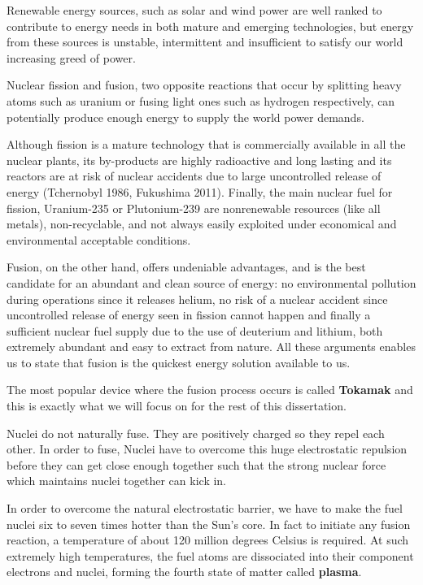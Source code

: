 \documentclass[12pt,lot, lof]{puthesis}
\begin{document}
Renewable energy sources, such as solar and wind power are well ranked to contribute to energy needs in both mature and emerging technologies, but energy from these sources is unstable, intermittent and insufficient to satisfy our world increasing greed of power.

Nuclear fission and fusion, two opposite reactions that occur by splitting heavy atoms such as uranium or fusing light ones such as hydrogen respectively, can potentially produce enough energy to supply the world power demands. 

Although fission is a mature technology that is commercially available in all the nuclear plants, its by-products are highly radioactive and long lasting and its reactors are at risk of nuclear accidents due to large uncontrolled release of energy (Tchernobyl 1986, Fukushima 2011). Finally, the main nuclear fuel for fission, Uranium-235 or Plutonium-239 are nonrenewable resources (like all metals), non-recyclable, and not always easily exploited under economical and environmental acceptable conditions.

Fusion, on the other hand, offers undeniable advantages, and is the best candidate for an abundant and clean source of energy: no environmental pollution during operations since it releases helium, no risk of a nuclear accident since uncontrolled release of energy seen in fission cannot happen and finally a sufficient nuclear fuel supply due to the use of deuterium and lithium, both extremely abundant and easy to extract from nature. All these arguments enables us to state that fusion is the quickest energy solution available to us.

The most popular device where the fusion process occurs is called \textbf{Tokamak} and this is exactly what we will focus on for the rest of this dissertation.

Nuclei do not naturally fuse. They are positively charged so they repel each other. In order to fuse, Nuclei have to overcome this huge electrostatic repulsion before they can get close enough together such that the strong nuclear force which maintains nuclei together can kick in.

In order to overcome the natural electrostatic barrier, we have to make the fuel nuclei six to seven times hotter than the Sun's core. In fact to initiate any fusion reaction, a temperature of about 120 million degrees Celsius is required. At such extremely high temperatures, the fuel atoms are dissociated into their component electrons and nuclei, forming the fourth state of matter called \textbf{plasma}.
\end{document}
